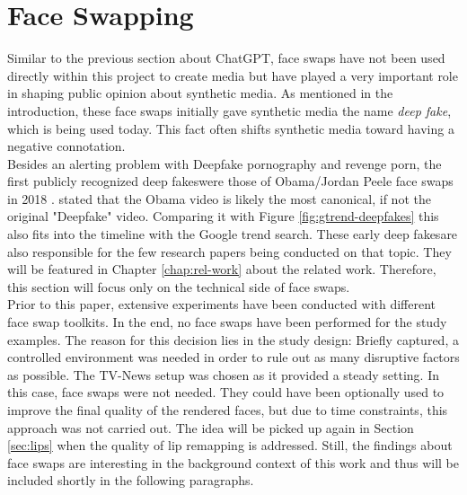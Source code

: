 \documentclass[
  a4paper,  %
  twoside,  %
  bibliography=totoc,
  headsepline,
  cleardoublepage=empty,
  parskip=half,
  draft=false
]{scrbook}
\begin{document}
\section{Face Swapping}
\label{sec:face-swapping}
Similar to the previous section about ChatGPT, face swaps have not been used directly within this project to create media but have played a very important role in shaping public opinion about synthetic media. As mentioned in the introduction, these face swaps initially gave synthetic media the name \textit{deep fake}, which is being used today. This fact often shifts synthetic media toward having a negative connotation. \\
Besides an alerting problem with Deepfake pornography and revenge porn, the first publicly recognized deep fakeswere those of Obama/Jordan Peele face swaps in 2018 \cite{vincentWatchJordanPeele2018}. \citet{hancockSocialImpactDeepfakes2021} stated that the Obama video is likely the most canonical, if not the original "Deepfake" video.
Comparing it with Figure \ref{fig:gtrend-deepfakes} this also fits into the timeline with the Google trend search. These early deep fakesare also responsible for the few research papers being conducted on that topic. They will be featured in Chapter \ref{chap:rel-work} about the related work. Therefore, this section will focus only on the technical side of face swaps. \\
Prior to this paper, extensive experiments have been conducted with different face swap toolkits. In the end, no face swaps have been performed for the study examples. The reason for this decision lies in the study design: Briefly captured, a controlled environment was needed in order to rule out as many disruptive factors as possible. The TV-News setup was chosen as it provided a steady setting. In this case, face swaps were not needed. They could have been optionally used to improve the final quality of the rendered faces, but due to time constraints, this approach was not carried out. The idea will be picked up again in Section \ref{sec:lips} when the quality of lip remapping is addressed.
Still, the findings about face swaps are interesting in the background context of this work and thus will be included shortly in the following paragraphs.
\end{document}
